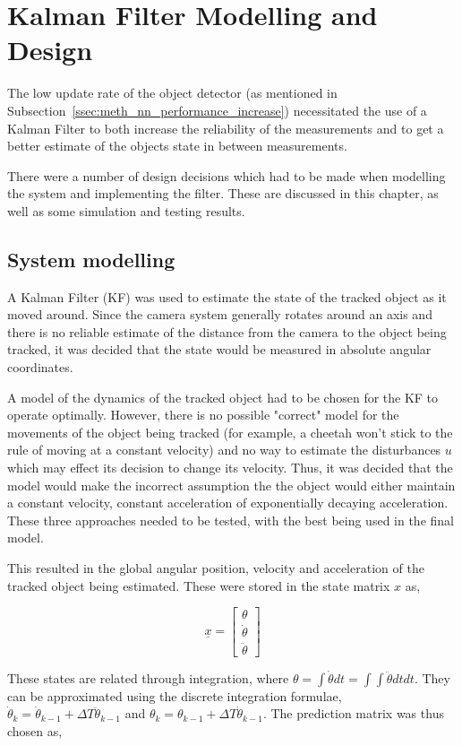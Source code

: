 \chapter{Kalman Filter Modelling and Design}

The low update rate of the object detector (as mentioned in Subsection~\ref{ssec:meth_nn_performance_increase}) necessitated the use of a Kalman Filter to both increase the reliability of the measurements and to get a better estimate of the objects state in between measurements.

There were a number of design decisions which had to be made when modelling the system and implementing the filter. These are discussed in this chapter, as well as some simulation and testing results.


\section{System modelling}
A Kalman Filter (KF) was used to estimate the state of the tracked object as it moved around. Since the camera system generally rotates around an axis and there is no reliable estimate of the distance from the camera to the object being tracked, it was decided that the state would be measured in absolute angular coordinates.

A model of the dynamics of the tracked object had to be chosen for the KF to operate optimally. However, there is no possible "correct" model for the movements of the object being tracked (for example, a cheetah won't stick to the rule of moving at a constant velocity) and no way to estimate the disturbances $u$ which may effect its decision to change its velocity. Thus, it was decided that the model would make the incorrect assumption the the object would either maintain a constant velocity, constant acceleration of exponentially decaying acceleration. These three approaches needed to be tested, with the best being used in the final model.

This resulted in the global angular position, velocity and acceleration of the tracked object being estimated. These were stored in the state matrix $x$ as,

\[ \underline{x} = \begin{bmatrix} \theta \\ \dot{\theta} \\ \ddot{\theta} \end{bmatrix} \]

These states are related through integration, where $\theta = \int{\dot{\theta} dt} = \int{\int{\ddot{\theta} dt}dt}$. They can be approximated using the discrete integration formulae, $\dot{\theta}_k = \dot{\theta}_{k-1} + \Delta T \ddot{\theta}_{k-1}$ and $\theta_k = \theta_{k-1} + \Delta T \dot{\theta}_{k-1}$. The prediction matrix was thus chosen as,

